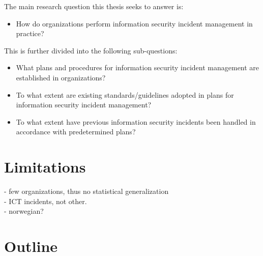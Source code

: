 The main research question this thesis seeks to answer is:
\begin{itemize}
\item How do organizations perform information security incident management in practice?
\end{itemize}

This is further divided into the following sub-questions:
\begin{itemize}\itemsep-0.1cm
\item What plans and procedures for information security incident management are established in organizations?
\item To what extent are existing standards/guidelines adopted in plans for information security incident management?
\item To what extent have previous information security incidents been handled in accordance with predetermined plans? 
\end{itemize}


\section{Limitations}

- few organizations, thus no statistical generalization\\
- ICT incidents, not other.\\
- norwegian?

\section{Outline}